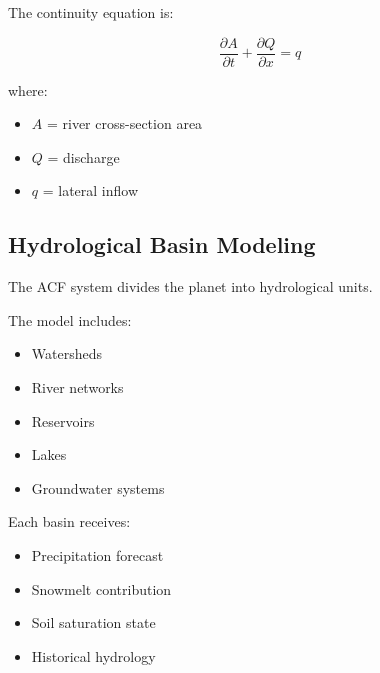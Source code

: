 The continuity equation is:

\[
\frac{\partial A}{\partial t}
+
\frac{\partial Q}{\partial x}
=
q
\]


where:

\begin{itemize}

\item $A$ = river cross-section area

\item $Q$ = discharge

\item $q$ = lateral inflow

\end{itemize}



\subsection{Hydrological Basin Modeling}

The ACF system divides the planet into hydrological units.

The model includes:

\begin{itemize}

\item Watersheds

\item River networks

\item Reservoirs

\item Lakes

\item Groundwater systems

\end{itemize}


Each basin receives:

\begin{itemize}

\item Precipitation forecast

\item Snowmelt contribution

\item Soil saturation state

\item Historical hydrology

\end{itemize}


